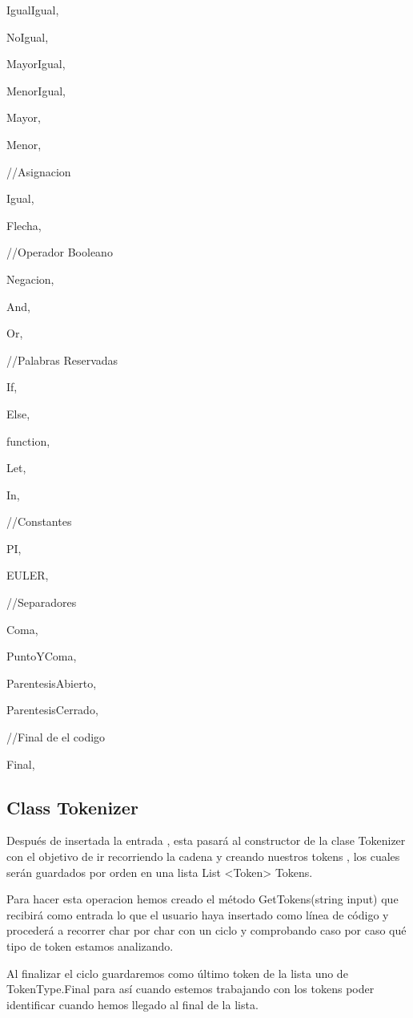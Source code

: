 \documentclass[a4paper,12pt]{article}
\begin{document}
    IgualIgual,
    
    NoIgual,
    
    MayorIgual,
    
    MenorIgual,
    
    Mayor,
    
    Menor,
    
    //Asignacion
    
    Igual,        
    
    Flecha,
    
    //Operador Booleano
    
    Negacion,
    
    And,
    
    Or,
    
    //Palabras Reservadas
    
    If,
    
    Else,
    
    function,
    
    Let,
    
    In,
    
    //Constantes 
    
    PI,
    
    EULER,
    
    //Separadores
    
    Coma,
    
    PuntoYComa,
    
    ParentesisAbierto,
    
    ParentesisCerrado,
    
    //Final de el codigo
    
    Final,

    \subsection{ Class Tokenizer}\label{sub:center}

Después de insertada la entrada , esta pasará al constructor de la clase Tokenizer con el objetivo de ir recorriendo la cadena 
y creando nuestros tokens , los cuales serán guardados por orden en una lista List  <Token>  Tokens.

Para hacer esta operacion hemos creado el método GetTokens(string input) que recibirá como entrada lo que el usuario haya insertado como línea de código y procederá a recorrer char por char 
con un ciclo y comprobando caso por caso qué tipo de token estamos analizando.

Al finalizar el ciclo guardaremos como último token de la lista uno de TokenType.Final para así cuando estemos trabajando con los tokens poder identificar cuando hemos llegado al final de la lista.
\end{document}
